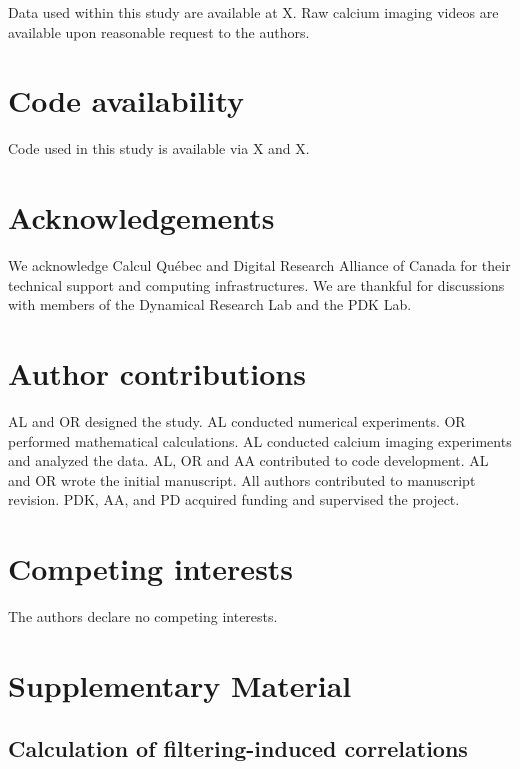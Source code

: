 \documentclass{article}
\begin{document}
Data used within this study are available at X. Raw calcium imaging videos are available upon reasonable request to the authors.

\section*{Code availability}

Code used in this study is available via X and X.
















\section*{Acknowledgements}

We acknowledge Calcul Québec and Digital Research Alliance of Canada for their technical support and computing infrastructures. We are thankful for discussions with members of the Dynamical Research Lab and the PDK Lab.

\section*{Author contributions}

AL and OR designed the study. AL conducted numerical experiments. OR performed mathematical calculations. AL conducted calcium imaging experiments and analyzed the data. AL, OR and AA contributed to code development. AL and OR wrote the initial manuscript. All authors contributed to manuscript revision. PDK, AA, and PD acquired funding and supervised the project.

\section*{Competing interests}

The authors declare no competing interests. 

\newpage



\section*{Supplementary Material}

\subsection*{Calculation of filtering-induced correlations}
\end{document}

